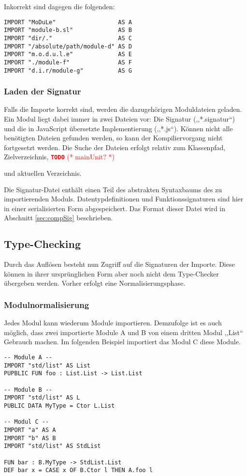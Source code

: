 \documentclass[runningheads]{llncs}
\newcommand{\TODO}[1]{ \textcolor{red}{\textbf{\texttt{\large{TODO}}} (* #1 *)}\par}
\begin{document}
Inkorrekt sind dagegen die folgenden:

\begin{verbatim}
IMPORT "MoDuLe"                  AS A
IMPORT "module-b.sl"             AS B
IMPORT "dir/."                   AS C
IMPORT "/absolute/path/module-d" AS D
IMPORT "m.o.d.u.l.e"             AS E
IMPORT "./module-f"              AS F
IMPORT "d.i.r/module-g"          AS G
\end{verbatim}

\subsubsection{Laden der Signatur}

Falls die Importe korrekt sind, werden die dazugehörigen Moduldateien geladen. Ein Modul liegt dabei immer in zwei Dateien vor: Die Signatur (,,*.signatur``) und die in JavaScript übersetzte Implementierung  (,,*.js``). Können nicht alle benötigten Dateien gefunden werden, so kann der Kompiliervorgang nicht fortgesetzt werden. Die Suche der Dateien erfolgt relativ zum Klassenpfad, Zielverzeichnis, \TODO{mainUnit?} und aktuellen Verzeichnis.

Die Signatur-Datei enthält einen Teil des abstrakten Syntaxbaums des zu importierenden Moduls. Datentypdefinitionen und Funktionssignaturen sind hier in einer serialisierten Form abgespeichert. Das Format dieser Datei wird in Abschnitt \ref{sec:compSig} beschrieben.

\subsection{Type-Checking}

Durch das Auflösen besteht nun Zugriff auf die Signaturen der Importe. Diese können in ihrer ursprünglichen Form aber noch nicht dem Type-Checker übergeben werden. Vorher erfolgt eine Normalisierungsphase.

\subsubsection{Modulnormalisierung}

Jedes Modul kann wiederum Module importieren. Demzufolge ist es auch möglich, dass zwei importierte Module A und B von einem dritten Modul ,,List`` Gebrauch machen. Im folgenden Beispiel importiert das Modul C diese Module.


\begin{verbatim}
-- Module A --
IMPORT "std/list" AS List
PUPBLIC FUN foo : List.List -> List.List

-- Module B --
IMPORT "std/list" AS L
PUBLIC DATA MyType = Ctor L.List

-- Modul C --
IMPORT "a" AS A
IMPORT "b" AS B
IMPORT "std/list" AS StdList

FUN bar : B.MyType -> StdList.List
DEF bar x = CASE x OF B.Ctor l THEN A.foo l
\end{verbatim}
\end{document}
